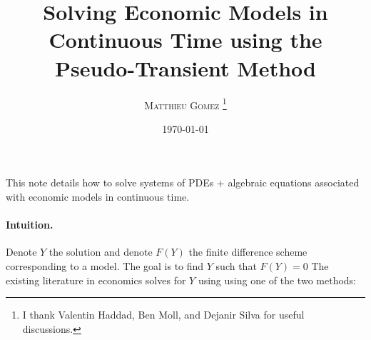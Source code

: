 \documentclass[english]{article}
\begin{document}
	\title{Solving Economic Models in Continuous Time using the Pseudo-Transient Method}
	\author{\large{\textsc{Matthieu Gomez \thanks{I thank Valentin Haddad, Ben Moll, and Dejanir Silva for useful discussions.}}}}
	\date{\today}
	\maketitle
	This note details how to solve systems of PDEs + algebraic equations associated with economic models in continuous time.

	\paragraph{Intuition.}
Denote $Y$  the solution and denote $F(Y)$ the finite difference scheme corresponding to a model. The goal is to find $Y$ such that $F(Y) = 0$ The existing literature in economics solves for $Y$ using using one of the two methods:
\end{document}
